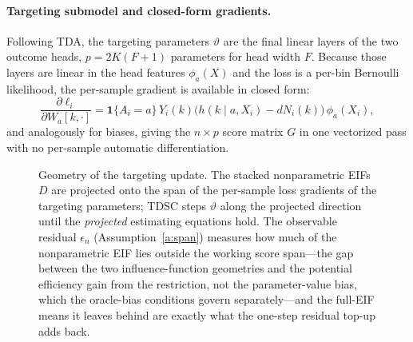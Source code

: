 \documentclass[11pt]{article}
\theoremstyle{remark}
\newcommand{\Pn}{P_n}
\newcommand{\ind}{\mathbf{1}}
\begin{document}
\paragraph{Targeting submodel and closed-form gradients.} Following TDA, the targeting parameters $\vartheta$ are the final linear layers of the two outcome heads, $p = 2K(F{+}1)$ parameters for head width $F$. Because those layers are linear in the head features $\phi_a(X)$ and the loss is a per-bin Bernoulli likelihood, the per-sample gradient is available in closed form:
\begin{equation}\label{eq:grad}
\frac{\partial \ell_i}{\partial W_a[k,\cdot]} = \ind\{A_i=a\}\, Y_i(k)\big(h(k\mid a, X_i) - dN_i(k)\big)\, \phi_a(X_i),
\end{equation}
and analogously for biases, giving the $n\times p$ score matrix $G$ in one vectorized pass with no per-sample automatic differentiation.

\begin{figure}[t]
\centering
{}
\caption{Geometry of the targeting update. The stacked nonparametric EIFs $D$ are projected onto the span of the per-sample loss gradients of the targeting parameters; TDSC steps $\vartheta$ along the projected direction until the \emph{projected} estimating equations hold. The observable residual $\epsilon_n$ (Assumption~\ref{a:span}) measures how much of the nonparametric EIF lies outside the working score span---the gap between the two influence-function geometries and the potential efficiency gain from the restriction, not the parameter-value bias, which the oracle-bias conditions govern separately---and the full-EIF means it leaves behind are exactly what the one-step residual top-up adds back.}
\label{fig:geometry}
\end{figure}
\end{document}
